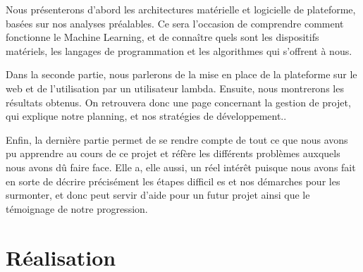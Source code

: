 \documentclass[a4paper,11pt]{article}
\begin{document}
Nous présenterons d’abord les architectures matérielle et logicielle de plateforme, basées sur nos analyses préalables.
Ce sera l’occasion de comprendre comment fonctionne le Machine Learning, et de connaître quels sont les dispositifs matériels, les langages de programmation et les algorithmes qui s’offrent à nous.

Dans la seconde partie, nous parlerons de la mise en place de la plateforme sur le web
et de l’utilisation par un utilisateur lambda. Ensuite, nous montrerons les résultats obtenus.
On retrouvera donc une page concernant la gestion de projet, qui explique notre planning, et nos stratégies de
développement..

Enfin, la dernière partie permet de se rendre compte de tout ce que nous avons pu apprendre au cours
de ce projet et réfère les différents problèmes auxquels nous avons dû faire face. Elle a, elle aussi,
un réel intérêt puisque nous avons fait en sorte de décrire précisément les étapes difficil
es et nos démarches
pour les surmonter, et donc peut servir d’aide pour un futur projet ainsi que le témoignage de notre progression.

\section{Réalisation}
\end{document}
